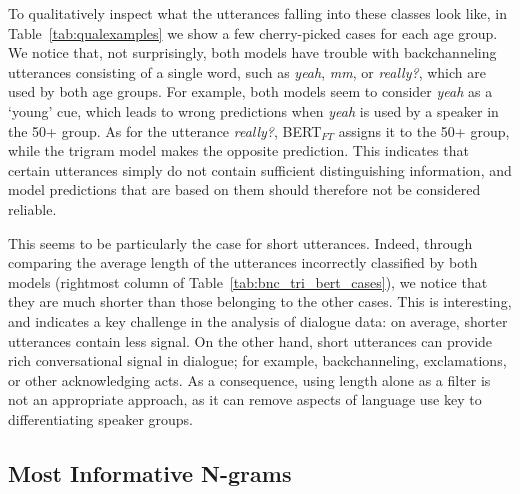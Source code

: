 To qualitatively inspect what the utterances falling into these classes look like, in Table~\ref{tab:qualexamples} we show a few cherry-picked cases for each age group. 
We notice that, not surprisingly, both models have trouble with backchanneling utterances consisting of a single word, such as \emph{yeah}, \emph{mm}, or \emph{really?}, which are used by both age groups.
For example, both models seem to consider \emph{yeah} as a `young' cue, which leads to wrong predictions when \emph{yeah} is used by a speaker in the 50+ group. As for the utterance \emph{really?}, BERT$_{FT}$ assigns it to the 50+ group, while the trigram model makes the opposite prediction.
This indicates that certain utterances simply do not contain sufficient distinguishing information, and model predictions that are based on them should therefore not be considered reliable.

This seems to be particularly the case for short utterances. Indeed, through comparing the average length of the utterances incorrectly classified by both models (rightmost column of Table~\ref{tab:bnc_tri_bert_cases}), we notice that they are much shorter than those belonging to the other cases. This is interesting, and indicates a key challenge in the analysis of dialogue data: 
on average, shorter utterances contain less signal. On the other hand, short utterances can provide rich conversational signal in dialogue; for example, backchanneling, exclamations, or other acknowledging acts. As a consequence, using length alone as a filter is not an appropriate approach, as it can remove aspects of language use key to differentiating speaker groups.


\subsection{Most Informative N-grams}

